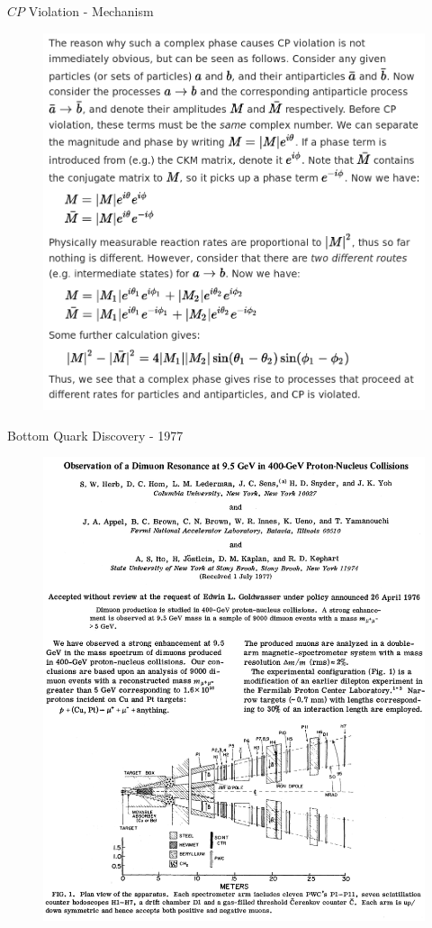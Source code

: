 \documentclass{beamer}
\begin{document}
\begin{frame}{$CP$ Violation \-- Mechanism}
  \begin{figure}
    \includegraphics[height=0.9\textheight]{figures/CP_Violation_Explain.png}
  \end{figure}
\end{frame}

\begin{frame}{Bottom Quark Discovery \-- 1977}
  \begin{figure}
    \includegraphics[height=0.9\textheight]{figures/Bottom_Quark_Discovery.png}
  \end{figure}
\end{frame}
\end{document}
